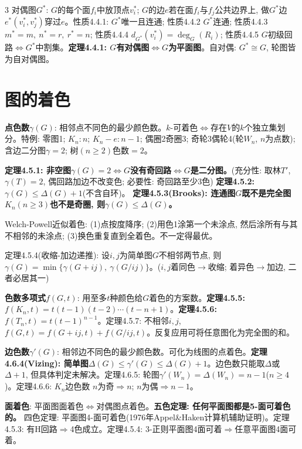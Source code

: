 \documentclass[4.5pt,landscape]{extarticle}
\newcommand{\rd}[1]{\textcolor{rd}{\textbf{#1}}}
\newcommand{\bu}[1]{\textcolor{bu}{\textbf{#1}}}
\newcommand{\xt}[1]{\textbf{#1}}
\begin{document}
\begin{multicols*}{3}
对偶图$G^*$: $G$的每个面$f_i$中放顶点$v_i^*$; $G$的边$e$若在面$f_i$与$f_j$公共边界上, 做$G^*$边$e^*(v_i^*,v_j^*)$穿过$e$。性质4.4.1: $G^*$唯一且连通; 性质4.4.2 $G^*$连通; 性质4.4.3 $m^*=m,\ n^*=r,\ r^*=n$; 性质4.4.4 $d_{G^*}(v_i^*)=\deg_G(R_i)$; 性质4.4.5 $G$初级回路$\Leftrightarrow G^*$中割集。\bu{定理4.4.1: $G$有对偶图$\Leftrightarrow G$为平面图}。自对偶: $G^*\cong G$, 轮图皆为自对偶图。

\section{图的着色}
\xt{点色数$\gamma(G)$}: 相邻点不同色的最少颜色数。$k$-可着色$\Leftrightarrow$存在$V$的$k$个独立集划分。特例: 零图1; $K_n:n$; $K_n-e:n-1$; 偶圈2奇圈3; 奇轮3偶轮4(轮$W_n$, $n$为点数); 含边二分图$\gamma=2$; 树$(n\geq2)$色数$=2$。

\bu{定理4.5.1: 非空图$\gamma(G)=2\Leftrightarrow G$没有奇回路$\Leftrightarrow G$是二分图。}(充分性: 取林$T'$, $\gamma(T)=2$, 偶回路加边不改变色; 必要性: 奇回路至少3色)
\bu{定理4.5.2: $\gamma(G)\leq\Delta(G)+1$}(不含自环)。
\bu{定理4.5.3(Brooks): 连通图$G$既不是完全图$K_n(n\geq3)$也不是奇圈, 则$\gamma(G)\leq\Delta(G)$。}

Welch-Powell近似着色: (1)点按度降序; (2)用色1涂第一个未涂点, 然后涂所有与其不相邻的未涂点; (3)换色重复直到全着色。不一定得最优。

定理4.5.4(收缩-加边递推): 设$i,j$为简单图$G$不相邻两节点, 则$\gamma(G)=\min\{\gamma(G+ij),\ \gamma(G/ij)\}$。($i,j$着同色$\to$收缩; 着异色$\to$加边, 二者必居其一)

\xt{色数多项式$f(G,t)$}: 用至多$t$种颜色给$G$着色的方案数。\bu{定理4.5.5: $f(K_n,t)=t(t-1)(t-2)\cdots(t-n+1)$}。\bu{定理4.5.6: $f(T_n,t)=t(t-1)^{n-1}$}。定理4.5.7: 不相邻$i,j$, $f(G,t)=f(G+ij,t)+f(G/ij,t)$。反复应用可将任意图化为完全图的和。

\xt{边色数$\gamma'(G)$}: 相邻边不同色的最少颜色数。可化为线图的点着色。\rd{定理4.6.4(Vizing): 简单图$\Delta(G)\leq\gamma'(G)\leq\Delta(G)+1$}。边色数只能取$\Delta$或$\Delta+1$, 但具体判定未解决。定理4.6.5: 轮图$\gamma'(W_n)=\Delta(W_n)=n-1$($n\geq4$)。定理4.6.6: $K_n$边色数 $n$为奇$\Rightarrow n$; $n$为偶$\Rightarrow n-1$。

\xt{面着色}: 平面图面着色$\Leftrightarrow$对偶图点着色。\bu{五色定理: 任何平面图都是5-面可着色的。} 四色定理: 平面图4-面可着色(1976年Appel\&Haken计算机辅助证明)。定理4.5.3: 有H回路$\Rightarrow$4色成立。定理4.5.4: 3-正则平面图4面可着$\Rightarrow$任意平面图4面可着。


\end{multicols*}
\end{document}
